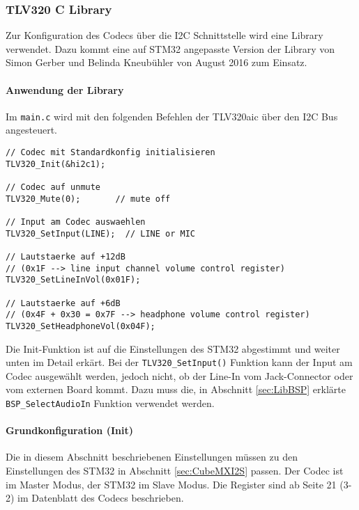 \subsubsection{TLV320 C Library}
\label{sec:Library_tlv320}

Zur Konfiguration des Codecs über die I2C Schnittstelle wird eine Library verwendet.
Dazu kommt eine auf STM32 angepasste Version der Library von Simon Gerber und Belinda Kneubühler von August 2016 zum Einsatz. \cite{FHNWtlv320}

\paragraph{Anwendung der Library}

Im \texttt{main.c} wird mit den folgenden Befehlen der TLV320aic über den I2C Bus angesteuert.

\begin{lstlisting}[style=Cuvision,caption={TLV320 Funktionen}]
// Codec mit Standardkonfig initialisieren
TLV320_Init(&hi2c1);

// Codec auf unmute
TLV320_Mute(0);       // mute off

// Input am Codec auswaehlen
TLV320_SetInput(LINE);  // LINE or MIC

// Lautstaerke auf +12dB  
// (0x1F --> line input channel volume control register)
TLV320_SetLineInVol(0x01F);

// Lautstaerke auf +6dB 
// (0x4F + 0x30 = 0x7F --> headphone volume control register)
TLV320_SetHeadphoneVol(0x04F);

\end{lstlisting}

Die Init-Funktion ist auf die Einstellungen des STM32 abgestimmt und weiter unten im Detail erkärt. 
Bei der \texttt{TLV320\_SetInput()} Funktion kann der Input am Codec ausgewählt werden, jedoch nicht, ob der Line-In vom Jack-Connector oder vom externen Board kommt. 
Dazu muss die, in Abschnitt \ref{sec:LibBSP} erklärte \texttt{BSP\_SelectAudioIn} Funktion verwendet werden.


\paragraph{Grundkonfiguration (Init)}

Die in diesem Abschnitt beschriebenen Einstellungen müssen zu den Einstellungen des STM32 in Abschnitt \ref{sec:CubeMXI2S} passen. Der Codec ist im Master Modus, der STM32 im Slave Modus. Die Register sind ab Seite 21 (3-2) im Datenblatt des Codecs beschrieben. \cite{tlv320}

